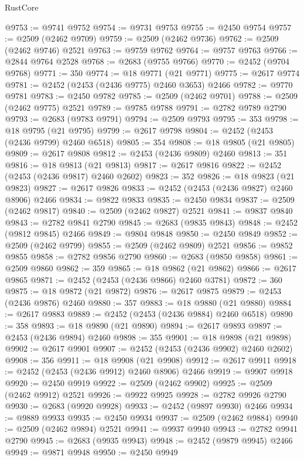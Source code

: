 \begin{lexlean}{RustCore}
\begin{coremodule}
@9753 := @9741 @9752
@9754 := @9731 @9753
@9755 := @2450 @9754
@9757 := @2509 (@2462 @9709)
@9759 := @2509 (@2462 @9736)
@9762 := @2509 (@2462 @9746) @2521
@9763 := @9759 @9762
@9764 := @9757 @9763
@9766 := @2844 @9764 @2528
@9768 := @2683 (@9755 @9766)
@9770 := @2452 (@9704 @9768)
@9771 := 350
@9774 := @18 @9771 (@21 @9771)
@9775 := @2617 @9774
@9781 := @2452 (@2453 (@2436 @9775) @2460 @3653) @2466
@9782 := @9770 @9781
@9783 := @2450 @9782
@9785 := @2509 (@2462 @9701)
@9788 := @2509 (@2462 @9775) @2521
@9789 := @9785 @9788
@9791 := @2782 @9789 @2790
@9793 := @2683 (@9783 @9791)
@9794 := @2509 @9793
@9795 := 353
@9798 := @18 @9795 (@21 @9795)
@9799 := @2617 @9798
@9804 := @2452 (@2453 (@2436 @9799) @2460 @6518)
@9805 := 354
@9808 := @18 @9805 (@21 @9805)
@9809 := @2617 @9808
@9812 := @2453 (@2436 @9809) @2460
@9813 := 351
@9816 := @18 @9813 (@21 @9813)
@9817 := @2617 @9816
@9822 := @2452 (@2453 (@2436 @9817) @2460 @2602)
@9823 := 352
@9826 := @18 @9823 (@21 @9823)
@9827 := @2617 @9826
@9833 := @2452 (@2453 (@2436 @9827) @2460 @8906) @2466
@9834 := @9822 @9833
@9835 := @2450 @9834
@9837 := @2509 (@2462 @9817)
@9840 := @2509 (@2462 @9827) @2521
@9841 := @9837 @9840
@9843 := @2782 @9841 @2790
@9845 := @2683 (@9835 @9843)
@9848 := @2452 (@9812 @9845) @2466
@9849 := @9804 @9848
@9850 := @2450 @9849
@9852 := @2509 (@2462 @9799)
@9855 := @2509 (@2462 @9809) @2521
@9856 := @9852 @9855
@9858 := @2782 @9856 @2790
@9860 := @2683 (@9850 @9858)
@9861 := @2509 @9860
@9862 := 359
@9865 := @18 @9862 (@21 @9862)
@9866 := @2617 @9865
@9871 := @2452 (@2453 (@2436 @9866) @2460 @3781)
@9872 := 360
@9875 := @18 @9872 (@21 @9872)
@9876 := @2617 @9875
@9879 := @2453 (@2436 @9876) @2460
@9880 := 357
@9883 := @18 @9880 (@21 @9880)
@9884 := @2617 @9883
@9889 := @2452 (@2453 (@2436 @9884) @2460 @6518)
@9890 := 358
@9893 := @18 @9890 (@21 @9890)
@9894 := @2617 @9893
@9897 := @2453 (@2436 @9894) @2460
@9898 := 355
@9901 := @18 @9898 (@21 @9898)
@9902 := @2617 @9901
@9907 := @2452 (@2453 (@2436 @9902) @2460 @2602)
@9908 := 356
@9911 := @18 @9908 (@21 @9908)
@9912 := @2617 @9911
@9918 := @2452 (@2453 (@2436 @9912) @2460 @8906) @2466
@9919 := @9907 @9918
@9920 := @2450 @9919
@9922 := @2509 (@2462 @9902)
@9925 := @2509 (@2462 @9912) @2521
@9926 := @9922 @9925
@9928 := @2782 @9926 @2790
@9930 := @2683 (@9920 @9928)
@9933 := @2452 (@9897 @9930) @2466
@9934 := @9889 @9933
@9935 := @2450 @9934
@9937 := @2509 (@2462 @9884)
@9940 := @2509 (@2462 @9894) @2521
@9941 := @9937 @9940
@9943 := @2782 @9941 @2790
@9945 := @2683 (@9935 @9943)
@9948 := @2452 (@9879 @9945) @2466
@9949 := @9871 @9948
@9950 := @2450 @9949

\end{coremodule}
\end{lexlean}

